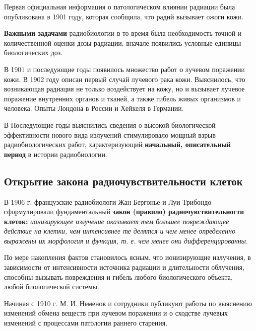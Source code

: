 \documentclass[a4paper, 14pt]{article}
\begin{document}
Первая официальная информация о патологическом влиянии радиации была
опубликована в 1901 году, которая сообщила, что радий вызывает ожоги кожи.

\textbf{Важными задачами} радиобиологии в то время была необходимость точной и
количественной оценки дозы радиации, вначале появились условные единицы
биологических доз.

В 1901 и последующие годы появилось множество работ о лучевом поражении
кожи. В 1902 году описан первый случай лучевого рака кожи. Выяснилось, что
возникающая радиация не только воздействует на кожу, но и вызывает лучевое
поражение внутренних органов и тканей, а также гибель живых организмов и
человека. Опыты Лондона в России и Хейкеля в Германии.

В Последующие годы выяснились сведения о высокой биологической эффективности нового вида излучений стимулировало мощный взрыв радиобиологических работ, характеризующий \textbf{начальный, описательный период} в истории радиобиологии.  

\subsection{Открытие закона радиочувствительности клеток}
В 1906 г. французские радиобиологи Жан Бергонье и Луи Трибондо сформулировали фундаментальный \textbf{закон (правило) радиочувствительности клеток:} \textit{ионизирующее излучение оказывает тем большее повреждающее действие на клетки, чем интенсивнее те делятся и чем менее определенно выражены их морфология и функция, т. е. чем менее они дифференцированны}. 

По мере накопления фактов становилось ясным, что ионизирующие излучения, в зависимости от интенсивности источника радиации и длительности облучения, способны вызывать повреждения и гибель любого биологического объекта, любой биологической системы.

Начиная с 1910 г. М. И. Неменов и сотрудники публикуют работы по
выяснению изменений обмена веществ при лучевом поражении и о сходстве лучевых
изменений с процессами патологии раннего старения.
\end{document}
